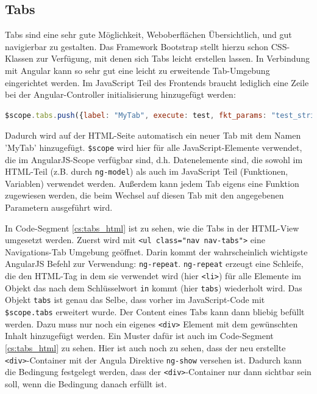 \subsection{Tabs}
Tabs sind eine sehr gute Möglichkeit, Weboberflächen Übersichtlich, und gut navigierbar zu gestalten. Das Framework Bootstrap stellt hierzu schon CSS-Klassen zur Verfügung, mit denen sich Tabs leicht erstellen lassen. In Verbindung mit Angular kann so sehr gut eine leicht zu erweitende Tab-Umgebung eingerichtet werden. Im JavaScript Teil des Frontends braucht lediglich eine Zeile bei der Angular-Controller initialisierung hinzugefügt werden:

\scriptsize
\begin{lstlisting}[language=Javascript]
$scope.tabs.push({label: "MyTab", execute: test, fkt_params: "test_string"});
\end{lstlisting}
\normalsize

Dadurch wird auf der HTML-Seite automatisch ein neuer Tab mit dem Namen 'MyTab' hinzugefügt. \verb|$scope| wird hier für alle JavaScript-Elemente verwendet, die im AngularJS-Scope verfügbar sind, d.h. Datenelemente sind, die sowohl im HTML-Teil (z.B. durch \verb|ng-model|) als auch im JavaScript Teil (Funktionen, Variablen) verwendet werden. Außerdem kann jedem Tab eigens eine Funktion zugewiesen werden, die beim Wechsel auf diesen Tab mit den angegebenen Parametern ausgeführt wird. 

In Code-Segment \ref{cs:tabs_html} ist zu sehen, wie die Tabs in der HTML-View umgesetzt werden. Zuerst wird mit \verb|<ul class="nav nav-tabs">| eine Navigations-Tab Umgebung geöffnet. Darin kommt der wahrscheinlich wichtigste AngularJS Befehl zur Verwendung: \verb|ng-repeat|. \verb|ng-repeat| erzeugt eine Schleife, die den HTML-Tag in dem sie verwendet wird (hier \verb|<li>|) für alle Elemente im Objekt das nach dem Schlüsselwort \verb|in| kommt (hier \verb|tabs|) wiederholt wird. Das Objekt \verb|tabs| ist genau das Selbe, dass vorher im JavaScript-Code mit \verb|$scope.tabs| erweitert wurde. Der Content eines Tabs kann dann bliebig befüllt werden. Dazu muss nur noch ein eigenes \verb|<div>| Element mit dem gewünschten Inhalt hinzugefügt werden. Ein Muster dafür ist auch im Code-Segment \ref{cs:tabs_html} zu sehen. Hier ist auch noch zu sehen, dass der neu erstellte \verb|<div>|-Container mit der Angula Direktive \verb|ng-show| versehen ist. Dadurch kann die Bedingung festgelegt werden, dass der \verb|<div>|-Container nur dann sichtbar sein soll, wenn die Bedingung danach erfüllt ist.

